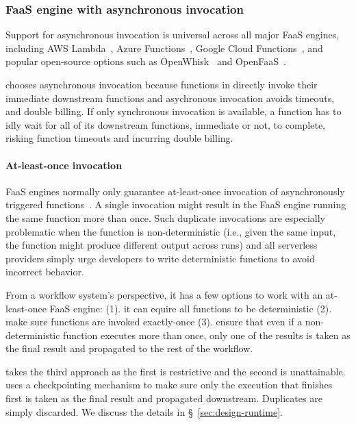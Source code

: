 \subsubsection{FaaS engine with asynchronous invocation}

Support for asynchronous invocation is universal across all major FaaS
engines, including AWS Lambda~\cite{aws-lambda-async-invoke}, Azure
Functions~\cite{azure-functions-async-invoke}, Google Cloud
Functions~\cite{google-cloud-functions-async-invoke}, and popular open-source
options such as OpenWhisk~\cite{openwhisk-async-invoke} and
OpenFaaS~\cite{openfaas-async-invoke}.

\name{} chooses asynchronous invocation because functions in \name{} directly invoke
their immediate downstream functions and asychronous invocation avoids
timeouts, and double billing. If only synchronous invocation is available, a
function has to idly wait for all of its downstream functions, immediate or
not, to complete, risking function timeouts and incurring double billing.

\paragraph{At-least-once invocation}

FaaS engines normally only guarantee at-least-once invocation of
asynchronously triggered
functions~\cite{google-cloud-functions-exec-guarantee,
aws-lambda-async-invoke, azure-functions-exec-guarantee}. A single invocation
might result in the FaaS engine running the same function more than once. Such
duplicate invocations are especially problematic when the function is
non-deterministic (i.e., given the same input, the function might produce
different output across runs) and all serverless providers simply urge
developers to write deterministic functions to avoid incorrect behavior.

From a workflow system's perspective, it has a few options to work with an
at-least-once FaaS engine: (1). it can equire all functions to be
deterministic (2). make sure functions are invoked exactly-once (3). ensure
that even if a non-deterministic function executes more than once, only one of
the results is taken as the final result and propagated to the rest of the
workflow.

\name{} takes the third approach as the first is restrictive and the second is
unattainable. \name{} uses a checkpointing mechanism to make sure only the
execution that finishes first is taken as the final result and propagated
downstream. Duplicates are simply discarded. We discuss the details in
\S~\ref{sec:design-runtime}.

